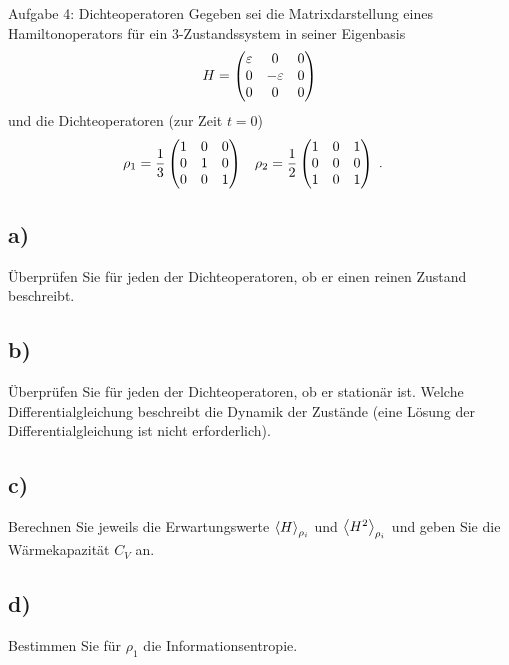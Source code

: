 \begin{aufgabe}{Aufgabe 4: Dichteoperatoren}
    Gegeben sei die Matrixdarstellung eines Hamiltonoperators für ein 3-Zustandssystem in seiner Eigenbasis
    \[
        H = \begin{pmatrix}\varepsilon & 0 & 0 \\ 0 & -\varepsilon & 0 \\ 0 & 0 & 0\end{pmatrix}
    \]
    und die Dichteoperatoren (zur Zeit $t=0$)
    \begin{align}
        \rho_1 &= \frac{1}{3} \begin{pmatrix}1 & 0 & 0 \\ 0 & 1 & 0 \\ 0 & 0 & 1\end{pmatrix} &
        \rho_2 &= \frac{1}{2} \begin{pmatrix}1 & 0 & 1 \\ 0 & 0 & 0 \\ 1 & 0 & 1\end{pmatrix} \;.
    \end{align}

    \subsection{a)}
    Überprüfen Sie für jeden der Dichteoperatoren, ob er einen reinen Zustand beschreibt.

    \subsection{b)}
    Überprüfen Sie für jeden der Dichteoperatoren, ob er stationär ist.
    Welche Differentialgleichung beschreibt die Dynamik der Zustände (eine Lösung der Differentialgleichung ist nicht erforderlich).

    \subsection{c)}
    Berechnen Sie jeweils die Erwartungswerte $\left\langle H\right\rangle_{\rho_i}$ und $\left\langle H^2\right\rangle_{\rho_i}$ und geben Sie die Wärmekapazität $C_V$ an.

    \subsection{d)}
    Bestimmen Sie für $\rho_1$ die Informationsentropie.
\end{aufgabe}

